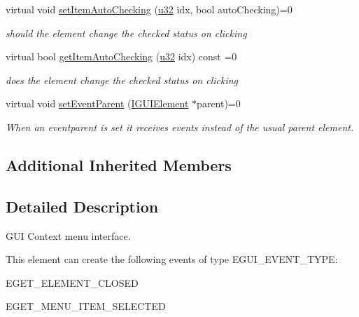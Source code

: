 \begin{DoxyCompactItemize}
\mbox{\label{classirr_1_1gui_1_1IGUIContextMenu_ab393d00ca81ee9482c5a81d19cc6e79e}} 
virtual void \hyperlink{classirr_1_1gui_1_1IGUIContextMenu_ab393d00ca81ee9482c5a81d19cc6e79e}{set\+Item\+Auto\+Checking} (\hyperlink{namespaceirr_a0416a53257075833e7002efd0a18e804}{u32} idx, bool auto\+Checking)=0
\begin{DoxyCompactList}\small\item\em should the element change the checked status on clicking \end{DoxyCompactList}\item 
\mbox{\label{classirr_1_1gui_1_1IGUIContextMenu_ae1c7364f115e633bcfc040864e30f4c1}} 
virtual bool \hyperlink{classirr_1_1gui_1_1IGUIContextMenu_ae1c7364f115e633bcfc040864e30f4c1}{get\+Item\+Auto\+Checking} (\hyperlink{namespaceirr_a0416a53257075833e7002efd0a18e804}{u32} idx) const =0
\begin{DoxyCompactList}\small\item\em does the element change the checked status on clicking \end{DoxyCompactList}\item 
\mbox{\label{classirr_1_1gui_1_1IGUIContextMenu_a2d87831a224817fc9c9dd8f41c69ac0a}} 
virtual void \hyperlink{classirr_1_1gui_1_1IGUIContextMenu_a2d87831a224817fc9c9dd8f41c69ac0a}{set\+Event\+Parent} (\hyperlink{classirr_1_1gui_1_1IGUIElement}{I\+G\+U\+I\+Element} $\ast$parent)=0
\begin{DoxyCompactList}\small\item\em When an eventparent is set it receives events instead of the usual parent element. \end{DoxyCompactList}\end{DoxyCompactItemize}
\subsection*{Additional Inherited Members}


\subsection{Detailed Description}
G\+UI Context menu interface. 

\begin{DoxyParagraph}{This element can create the following events of type E\+G\+U\+I\+\_\+\+E\+V\+E\+N\+T\+\_\+\+T\+Y\+PE\+:}
\begin{DoxyItemize}
\item E\+G\+E\+T\+\_\+\+E\+L\+E\+M\+E\+N\+T\+\_\+\+C\+L\+O\+S\+ED \item E\+G\+E\+T\+\_\+\+M\+E\+N\+U\+\_\+\+I\+T\+E\+M\+\_\+\+S\+E\+L\+E\+C\+T\+ED \end{DoxyItemize}

\end{DoxyParagraph}


